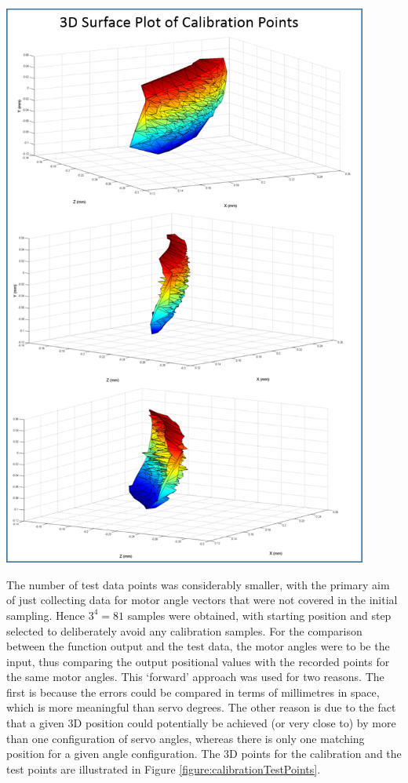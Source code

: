 \documentclass[11pt]{article}
\begin{document}
\begin{center}
\includegraphics[width=0.9\textwidth]{images/surfacePlotTogether.png}
\label{figure:surfacePlot}
\end{center}


The number of test data points was considerably smaller, with the primary aim of just collecting data for motor angle vectors that were not covered in the initial sampling. Hence $3^4 = 81$ samples were obtained, with starting position and step selected to deliberately avoid any calibration samples. For the comparison between the function output and the test data, the motor angles were to be the input, thus comparing the output positional values with the recorded points for the same motor angles. This `forward' approach was used for two reasons. The first is because the errors could be compared in terms of millimetres in space, which is more meaningful than servo degrees. The other reason is due to the fact that a given 3D position could potentially be achieved (or very close to) by more than one configuration of servo angles, whereas there is only one matching position for a given angle configuration. The 3D points for the calibration and the test points are illustrated in Figure \ref{figure:calibrationTestPoints}. 
\end{document}
